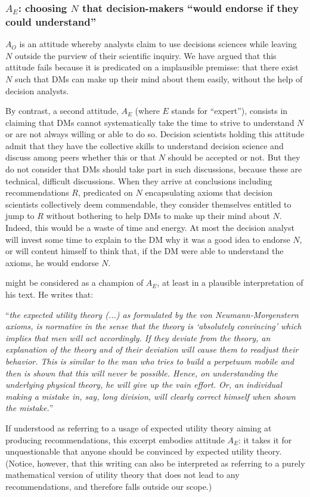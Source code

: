 \documentclass[preprint, french, english, 11pt, authoryear]{elsarticle}%
\newcommand{\protectforpdf}[1]{\texorpdfstring{\ensuremath{#1}}{#1}}
\begin{document}
\subsubsection{\texorpdfstring{$A_E$}{AE}: choosing \protectforpdf{N} that decision-makers “would endorse if they could understand”}
$A_O$ is an attitude whereby analysts claim to use decisions sciences while leaving $N$ outside the purview of their scientific inquiry. We have argued that this attitude fails because it is predicated on a implausible premisse: that there exist $N$ such that \acp{DM} can make up their mind about them easily, without the help of decision analysts. 

By contrast, a second attitude, $A_E$ (where $E$ stands for “expert”), consists in claiming that \acp{DM} cannot systematically take the time to strive to understand $N$ or are not always willing or able to do so. Decision scientists holding this attitude admit that they have the collective skills to understand decision science and discuss among peers whether this or that $N$ should be accepted or not. But they do not consider that \acp{DM} should take part in such discussions, because these are technical, difficult discussions. When they arrive at conclusions including recommendations $R$, predicated on $N$ encapsulating axioms that decision scientists collectively deem commendable, they consider themselves entitled to jump to $R$ without bothering to help \acp{DM} to make up their mind about $N$. Indeed, this would be a waste of time and energy. At most the decision analyst will invest some time to explain to the \ac{DM} why it was a good idea to endorse $N$, or will content himself to think that, if the \ac{DM} were able to understand the axioms, he would endorse $N$.

\citet[p. 180]{morgenstern_reflections_1979} might be considered as a champion of $A_E$, at least in a plausible interpretation of his text. He writes that: 

\begin{addmargin}[3em]{3em}
“\emph{the expected utility theory (...) as formulated by the von Neumann-Morgenstern axioms, is normative in the sense that the theory is ‘absolutely convincing’ which implies that men will act accordingly. If they deviate from the theory, an explanation of the theory and of their deviation will cause them to readjust their behavior. This is similar to the man who tries to build a perpetuum mobile and then is shown that this will never be possible. Hence, on understanding the underlying physical theory, he will give up the vain effort. Or, an individual making a mistake in, say, long division, will clearly correct himself when shown the mistake.}” 
\end{addmargin}
If understood as referring to a usage of expected utility theory aiming at producing recommendations, this excerpt embodies attitude $A_E$: it takes it for unquestionable that anyone should be convinced by expected utility theory. (Notice, however, that this writing can also be interpreted as referring to a purely mathematical version of utility theory that does not lead to any recommendations, and therefore falls outside our scope.)
\end{document}
